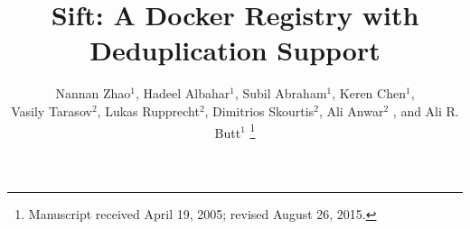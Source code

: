 \documentclass[10pt,journal,compsoc]{IEEEtran}
\newcommand{\sysname}{Sift\xspace}
\begin{document}
\title{
\sysname: A Docker Registry with Deduplication Support
}


\author{
		Nannan Zhao$^{1}$,
		Hadeel Albahar$^{1}$,
		Subil Abraham$^{1}$,
		Keren Chen$^{1}$,
		
	Vasily Tarasov$^{2}$,
	Lukas Rupprecht$^{2}$, 
	Dimitrios Skourtis$^{2}$,
	Ali Anwar$^{2}$
,
	and Ali R. Butt$^{1}$ %
	\thanks{Manuscript received April 19, 2005; revised August 26, 2015.}
	
}

\end{document}
